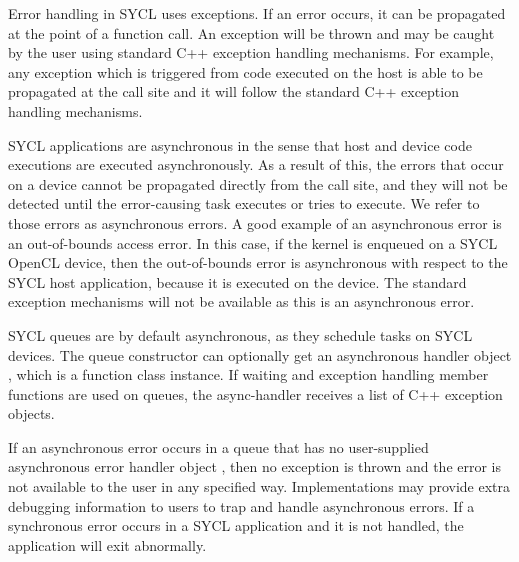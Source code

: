 Error handling in SYCL uses exceptions. If an error occurs, it can
be propagated at the point of a function call. An exception will
be thrown and may be caught by the user using standard C++ exception handling
mechanisms. For example, any exception which is triggered from code executed on the
host is able to be propagated at the call site and it will follow the standard
C++ exception handling mechanisms.

SYCL applications are asynchronous in the sense that host and device code executions
are executed asynchronously. As a result of this, the errors that occur on a
device cannot be propagated directly from the call site, and they will not be
detected until the error-causing task executes or tries to execute.
We refer to those errors as asynchronous errors.
A good example of an asynchronous error is an out-of-bounds access error.
In this case, if the kernel is enqueued on a SYCL OpenCL device, then the
out-of-bounds error is asynchronous with respect to the SYCL host application,
because it is executed on the device. The standard exception mechanisms
will not be available as this is an asynchronous error.

SYCL queues are by default asynchronous, as they schedule tasks on SYCL devices.
The queue constructor can optionally get an asynchronous handler object
, which is a function class instance. If waiting and
exception handling member functions are used on queues, the \gls{async-handler} receives
a list of C++ exception objects.

If an asynchronous error occurs in a queue that has no user-supplied
asynchronous error handler object , then no exception
is thrown and the error is not available to the user in any specified way.
Implementations may provide extra debugging information to users to trap and handle
asynchronous errors. If a synchronous error occurs in a SYCL application and it
is not handled, the application will exit abnormally.

